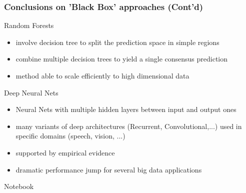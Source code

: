   \begin{frame}
  \frametitle{Conclusions on 'Black Box' approaches (Cont'd)}
    
   \begin{block}{ Random Forests}
   \begin{itemize}
    \item involve decision tree to split the prediction space in simple regions
    \item combine multiple decision trees to yield a single consensus prediction
    \item[\doigt] method able to scale efficiently  to high dimensional data
   \end{itemize}
   \end{block}

  
  \begin{block}{Deep Neural Nets}
  \begin{itemize}
   \item Neural Nets with multiple hidden layers between input and output ones   
   \item many variants of deep architectures (Recurrent, Convolutional,...)  used in specific domains (speech, vision, ...)
   \item[\doigt] supported by empirical evidence
   \item[\doigt] dramatic performance jump for several big data applications
    \end{itemize}
 \end{block} 

 \alert{Notebook}
\end{frame}


